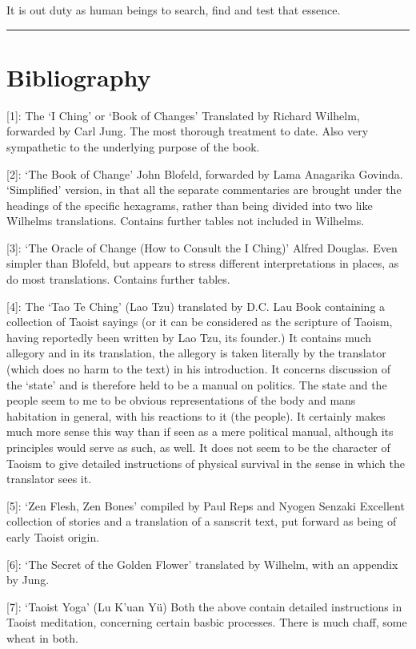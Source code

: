 \documentclass[11pt]{book}
\begin{document}
It is out duty as human beings to search, find and test that essence.

\begin{center}\rule{0.5\linewidth}{0.5pt}\end{center}

\hypertarget{bibliography}{%
\section{Bibliography}\label{bibliography}}

{[}1{]}: The `I Ching' or `Book of Changes' Translated by Richard Wilhelm, forwarded by Carl Jung. The most thorough treatment to date. Also very sympathetic to the underlying purpose of the book.

{[}2{]}: `The Book of Change' John Blofeld, forwarded by Lama Anagarika Govinda. `Simplified' version, in that all the separate commentaries are brought under the headings of the specific hexagrams, rather than being divided into two like Wilhelms translations. Contains further tables not included in Wilhelms.

{[}3{]}: `The Oracle of Change (How to Consult the I Ching)' Alfred Douglas. Even simpler than Blofeld, but appears to stress different interpretations in places, as do most translations. Contains further tables.

{[}4{]}: The `Tao Te Ching' (Lao Tzu) translated by D.C. Lau Book containing a collection of Taoist sayings (or it can be considered as the scripture of Taoism, having reportedly been written by Lao Tzu, its founder.) It contains much allegory and in its translation, the allegory is taken literally by the translator (which does no harm to the text) in his introduction. It concerns discussion of the `state' and is therefore held to be a manual on politics. The state and the people seem to me to be obvious representations of the body and mans habitation in general, with his reactions to it (the people). It certainly makes much more sense this way than if seen as a mere political manual, although its principles would serve as such, as well. It does not seem to be the character of Taoism to give detailed instructions of physical survival in the sense in which the translator sees it.

{[}5{]}: `Zen Flesh, Zen Bones' compiled by Paul Reps and Nyogen Senzaki Excellent collection of stories and a translation of a sanscrit text, put forward as being of early Taoist origin.

{[}6{]}: `The Secret of the Golden Flower' translated by Wilhelm, with an appendix by Jung.

{[}7{]}: `Taoist Yoga' (Lu K'uan Yü) Both the above contain detailed instructions in Taoist meditation, concerning certain basbic processes. There is much chaff, some wheat in both.

\backmatter
\end{document}
